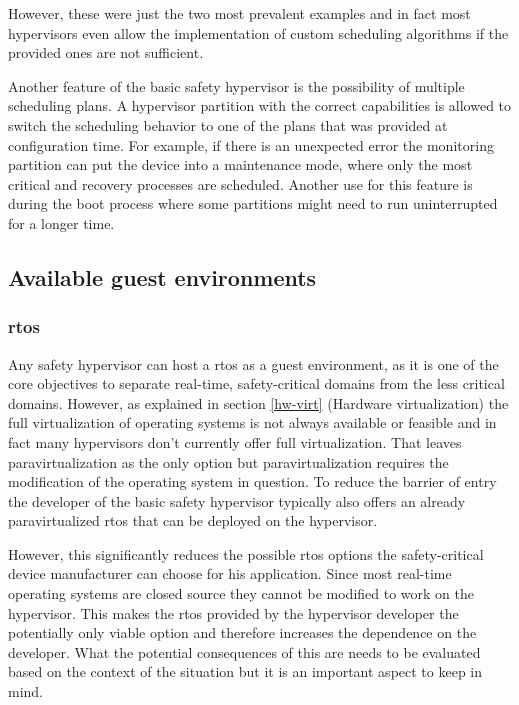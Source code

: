 However, these were just the two most prevalent examples and in fact most hypervisors even allow the implementation of custom scheduling algorithms if the provided ones are not sufficient.

Another feature of the basic safety hypervisor is the possibility of multiple scheduling plans. A hypervisor partition with the correct capabilities is allowed to switch the scheduling behavior to one of the plans that was provided at configuration time. For example, if there is an unexpected error the monitoring partition can put the device into a maintenance mode, where only the most critical and recovery processes are scheduled. Another use for this feature is during the boot process where some partitions might need to run uninterrupted for a longer time.

\subsection{Available guest environments}
\subsubsection{\acrshort{rtos}}
Any safety hypervisor can host a \acrlong{rtos} as a guest environment, as it is one of the core objectives to separate real-time, safety-critical domains from the less critical domains. However, as explained in section \ref{hw-virt} (Hardware virtualization) the full virtualization of operating systems is not always available or feasible and in fact many hypervisors don't currently offer full virtualization. That leaves paravirtualization as the only option but paravirtualization requires the modification of the operating system in question. To reduce the barrier of entry the developer of the basic safety hypervisor typically also offers an already paravirtualized \acrshort{rtos} that can be deployed on the hypervisor. 

However, this significantly reduces the possible \acrshort{rtos} options the safety-critical device manufacturer can choose for his application. Since most real-time operating systems are closed source they cannot be modified to work on the hypervisor. This makes the \acrshort{rtos} provided by the hypervisor developer the potentially only viable option and therefore increases the dependence on the developer. What the potential consequences of this are needs to be evaluated based on the context of the situation but it is an important aspect to keep in mind.


